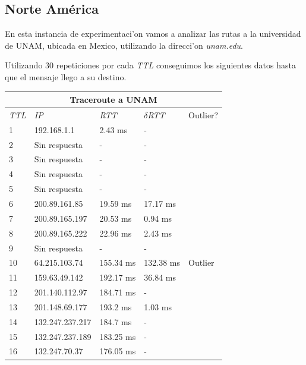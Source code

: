 \subsection{Norte América}

En esta instancia de experimentaci'on vamos a analizar las rutas a la universidad de UNAM, ubicada en Mexico, utilizando la direcci'on \textit{unam.edu}. 

Utilizando 30 repeticiones por cada \textit{TTL}  conseguimos los siguientes datos hasta que el mensaje llego a su destino.

\begin{tabular}{ |p{1cm}||p{3cm}|p{2cm}|p{2cm}|p{1.5cm}|  }
 \hline
 \multicolumn{5}{|c|}{Traceroute a UNAM} \\
 \hline
 \textit{TTL} & \textit{IP}  & \textit{RTT} & $\delta$\textit{RTT} & Outlier? \\
 \hline
1    &    192.168.1.1    &     2.43 ms      &     -           &     \\               
2    &    Sin respuesta              &    -             &    -           &          \\                  
3     &   Sin respuesta              &    -            &     -         &        \\               
4    &    Sin respuesta               &    -            &     -          &        \\                   
5    &    Sin respuesta                &   -            &     -          &        \\                
6     &   200.89.161.85   &    19.59 ms     &     17.17 ms   &        \\              
7     &   200.89.165.197  &    20.53 ms     &     0.94 ms   &        \\            
8    &    200.89.165.222  &    22.96 ms     &     2.43 ms   &      \\               
9    &    Sin respuesta               &    -            &     -         &         \\                 
10   &    64.215.103.74    &   155.34 ms     &    132.38 ms  &  Outlier  \\    
11   &    159.63.49.142    &   192.17 ms    &     36.84 ms    &           \\              
12   &    201.140.112.97   &   184.71 ms    &     -         &           \\                
13   &    201.148.69.177   &   193.2 ms     &     1.03 ms         &      \\                    
14   &    132.247.237.217  &   184.7 ms      &    -         &           \\                 
15   &    132.247.237.189  &   183.25 ms    &     -         &          \\                  
16    &   132.247.70.37    &   176.05 ms     &    -        &       \\   
 \hline
\end{tabular}


